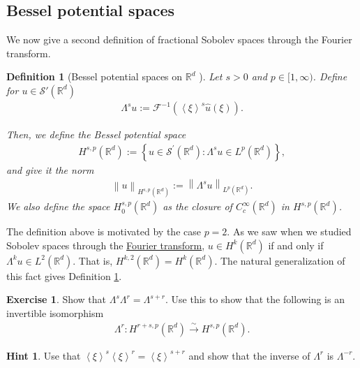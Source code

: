 \documentclass[
    a4paper,
    DIV=14,
    abstract=true,
    numbers=noenddot
]
{scrartcl}
\newtheorem{definition}[theorem]{Definition}
\theoremstyle{definition}
\newtheorem{exercise}{Exercise}
\newtheorem*{hint}{Hint}
\newcommand{\wh}[1]{\widehat{#1}}
\newcommand{\br}[1]{\left\langle#1\right\rangle}
\renewcommand{\norm}[1]{\left\lVert #1 \right\rVert}\renewcommand{\abs}[1]{\left| #1 \right|}
\newcommand{\iso}{\xrightarrow{\sim}}
\newcommand{\R}{\mathbb{R}}
\newcommand{\Ff}{\mathcal{F}}
\newcommand{\Ss}{\mathcal{S}}
\begin{document}
\subsection{Bessel potential spaces}
We now give a second definition of fractional Sobolev spaces through the Fourier transform.
\begin{definition}[Bessel potential spaces on $\R^d$ ]\label{bessel potential def}
    Let $s>0$ and $p \in [1,\infty)$. Define for $u \in \Ss'(\R^d)$
    \begin{align*}
        \Lambda^s u := \Ff^{-1}\left(\br{\xi}^s \wh{u}(\xi)\right).
    \end{align*}

    Then, we define the \emph{Bessel potential space}
    \begin{align*}
        H^{s,p}(\R^d):=\left\{u \in \mathcal{S}^{\prime}(\mathbb{R}^d): \Lambda ^s u \in L^p(\mathbb{R}^d)\right\},
    \end{align*}
    and give it the norm
    \begin{align*}
        \norm{u}_{H^{s,p}(\R^d)}:= \norm{\Lambda^s u}_{L^p(\R^d)}.
    \end{align*}
    We also define the space $H_0^{s,p}(\R^d)$ as the closure of $C_c^\infty(\R^d)$ in $H^{s,p}(\R^d)$.
\end{definition}
The definition above is motivated by the case $p=2$. As we saw when we studied Sobolev spaces through the \href{https://nowheredifferentiable.com/2023-01-29-PDE-1-Fourier/#:~:text=Sobolev%20spaces-,Sobolev%20spaces,-form%20a%20particular}{Fourier transform}, $u \in H^k(\R^d)$ if and only if $\Lambda^k u \in L^2(\R^d)$. That is, $H^{k,2}(\R^d)=H^{k}(\R^d)$.
The natural generalization of this fact gives Definition \ref{bessel potential def}.
\begin{exercise}
    Show that $\Lambda^s\Lambda^r=\Lambda^{s+r}$. Use this to show that the following is an invertible isomorphism
    \begin{align*}
        \Lambda^r: H^{r+s,p}(\R^d) \iso  H^{s,p}(\R^d).
    \end{align*}
\end{exercise}
\begin{hint}
    Use that $\br{\xi}^s\br{\xi}^r=\br{\xi}^{s+r}$ and show that the inverse of $\Lambda^r$ is $\Lambda^{-r}$.
\end{hint}
\end{document}
